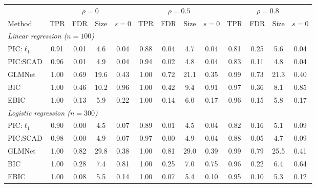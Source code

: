 \begin{tabular}{lcccccccccccc}
\toprule
 & \multicolumn{4}{c}{$\rho = 0$} & \multicolumn{4}{c}{$\rho = 0.5$} & \multicolumn{4}{c}{$\rho = 0.8$} \\
\cmidrule(lr){2-5} \cmidrule(lr){6-9} \cmidrule(lr){10-13}
Method & TPR & FDR & Size & $s{=}0$ & TPR & FDR & Size & $s{=}0$ & TPR & FDR & Size & $s{=}0$ \\
\midrule
\multicolumn{13}{l}{\textit{Linear regression ($n = 100$)}} \\
PIC:$\ell_1$ & 0.91 & 0.01 & 4.6 & 0.04 & 0.88 & 0.04 & 4.7 & 0.04 & 0.81 & 0.25 & 5.6 & 0.04 \\
PIC:SCAD & 0.96 & 0.01 & 4.9 & 0.04 & 0.94 & 0.02 & 4.8 & 0.04 & 0.83 & 0.11 & 4.8 & 0.04 \\
GLMNet & 1.00 & 0.69 & 19.6 & 0.43 & 1.00 & 0.72 & 21.1 & 0.35 & 0.99 & 0.73 & 21.3 & 0.40 \\
BIC & 1.00 & 0.46 & 10.2 & 0.96 & 1.00 & 0.42 & 9.4 & 0.91 & 0.97 & 0.36 & 8.1 & 0.85 \\
EBIC & 1.00 & 0.13 & 5.9 & 0.22 & 1.00 & 0.14 & 6.0 & 0.17 & 0.96 & 0.15 & 5.8 & 0.17 \\
\midrule
\multicolumn{13}{l}{\textit{Logistic regression ($n = 300$)}} \\
PIC:$\ell_1$ & 0.90 & 0.00 & 4.5 & 0.07 & 0.89 & 0.01 & 4.5 & 0.04 & 0.82 & 0.16 & 5.1 & 0.09 \\
PIC:SCAD & 0.98 & 0.00 & 4.9 & 0.07 & 0.97 & 0.00 & 4.9 & 0.04 & 0.88 & 0.05 & 4.7 & 0.09 \\
GLMNet & 1.00 & 0.82 & 29.8 & 0.38 & 1.00 & 0.81 & 29.0 & 0.39 & 0.99 & 0.79 & 25.5 & 0.41 \\
BIC & 1.00 & 0.28 & 7.4 & 0.81 & 1.00 & 0.25 & 7.0 & 0.75 & 0.96 & 0.22 & 6.4 & 0.64 \\
EBIC & 1.00 & 0.08 & 5.5 & 0.14 & 1.00 & 0.07 & 5.4 & 0.10 & 0.95 & 0.10 & 5.3 & 0.12 \\
\bottomrule
\end{tabular}
